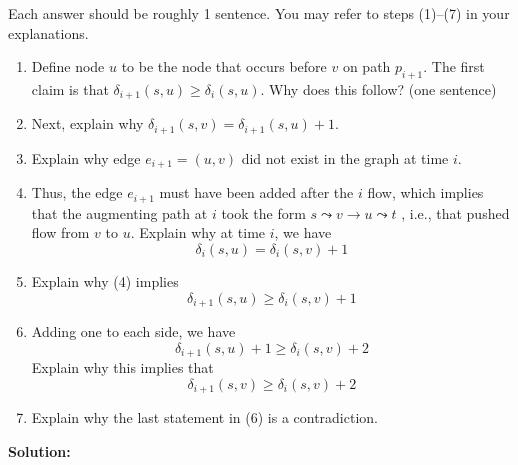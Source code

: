 \documentclass[11pt]{article}
\begin{document}
\medskip

Each answer should be roughly 1 sentence. You may refer to steps (1)--(7) in your explanations.

\begin{enumerate}
    \item Define node $u$ to be the node that occurs before $v$ on path $p_{i+1}$.  The first claim is that $\delta_{i+1}(s,u) \geq \delta_i(s,u)$.
    Why does this follow? (one sentence)
    
    \item Next, explain why $\delta_{i+1}(s,v) = \delta_{i+1}(s,u) + 1$. 
    
    \item Explain why edge $e_{i+1}=(u, v)$ did not exist in the graph at time $i$. 
    
    \item Thus, the edge $e_{i+1}$ must have been added after the $i$ flow, which implies that the augmenting path at $i$ took the form $s\leadsto v \rightarrow u \leadsto t$ , i.e., that pushed flow from $v$ to $u$.
    Explain why at time $i$, we have
    $$\delta_{i}(s,u) = \delta_{i}(s,v)+1$$

    \item Explain why (4) implies
    $$\delta_{i+1}(s,u) \geq \delta_i(s,v)+1$$
    \item Adding one to each side, we have
    $$\delta_{i+1}(s,u) +1 \geq \delta_i(s,v)+2$$
    Explain why this implies that
    $$\delta_{i+1}(s,v) \geq \delta_i(s,v)+2$$
    \item Explain why the last statement in (6) is a contradiction.
\end{enumerate}
\newpage
\noindent\textbf{Solution:}
\end{document}
